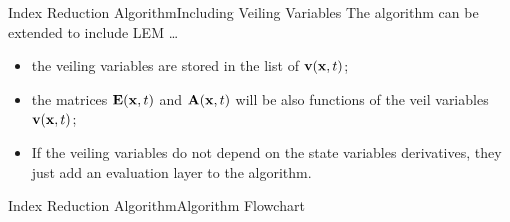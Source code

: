 \begin{frame}{Index Reduction Algorithm}{Including Veiling Variables}
  The algorithm can be extended to include \acl*{LEM} \dots
  \begin{itemize}
    \item the veiling variables are stored in the list of $\mathbf{v}(\mathbf{x}, t)$;
    \item the matrices $\mathbf{E}(\mathbf{x}, t)$ and $\mathbf{A}(\mathbf{x}, t)$ will be also functions of the veil variables $\mathbf{v}(\mathbf{x}, t)$;
    \item If the veiling variables do not depend on the state variables derivatives, they just add an evaluation layer to the algorithm.
  \end{itemize}
  \vspace{0.5em}
\end{frame}

\begin{frame}{Index Reduction Algorithm}{Algorithm Flowchart}
  \centering
\end{frame}

